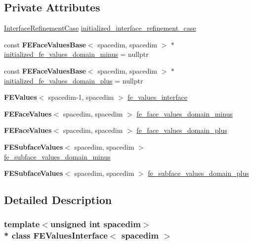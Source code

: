 \subsection*{Private Attributes}
\begin{DoxyCompactItemize}
\item 
\hyperlink{triangulation__system_8h_a4cfb8c5e21535951e919b6a6b1023af7}{Interface\+Refinement\+Case} \hyperlink{class_f_e_values_interface_a4a14b4fa181df533a6c7e7971fad5c4e}{initialized\+\_\+interface\+\_\+refinement\+\_\+case}
\item 
const {\bf F\+E\+Face\+Values\+Base}$<$ spacedim, spacedim $>$ $\ast$ \hyperlink{class_f_e_values_interface_a48f1a887c14615d665408f156d879980}{initialized\+\_\+fe\+\_\+values\+\_\+domain\+\_\+minus} = nullptr
\item 
const {\bf F\+E\+Face\+Values\+Base}$<$ spacedim, spacedim $>$ $\ast$ \hyperlink{class_f_e_values_interface_ab1f7524d517a79cd5e4adbd43017f415}{initialized\+\_\+fe\+\_\+values\+\_\+domain\+\_\+plus} = nullptr
\item 
{\bf F\+E\+Values}$<$ spacedim-\/1, spacedim $>$ \hyperlink{class_f_e_values_interface_a75f4ee97ebaefa2d1ded52c445953473}{fe\+\_\+values\+\_\+interface}
\item 
{\bf F\+E\+Face\+Values}$<$ spacedim, spacedim $>$ \hyperlink{class_f_e_values_interface_a1ce4354bfe2e852fdc5b7917614404a7}{fe\+\_\+face\+\_\+values\+\_\+domain\+\_\+minus}
\item 
{\bf F\+E\+Face\+Values}$<$ spacedim, spacedim $>$ \hyperlink{class_f_e_values_interface_a6d6820b66a2694d327238c6b3c7fb30c}{fe\+\_\+face\+\_\+values\+\_\+domain\+\_\+plus}
\item 
{\bf F\+E\+Subface\+Values}$<$ spacedim, spacedim $>$ \hyperlink{class_f_e_values_interface_abe003c242c807dd162c396d812bbfe77}{fe\+\_\+subface\+\_\+values\+\_\+domain\+\_\+minus}
\item 
{\bf F\+E\+Subface\+Values}$<$ spacedim, spacedim $>$ \hyperlink{class_f_e_values_interface_a184e705efd975db536299ad619585a65}{fe\+\_\+subface\+\_\+values\+\_\+domain\+\_\+plus}
\end{DoxyCompactItemize}


\subsection{Detailed Description}
\subsubsection*{template$<$unsigned int spacedim$>$\\*
class F\+E\+Values\+Interface$<$ spacedim $>$}

